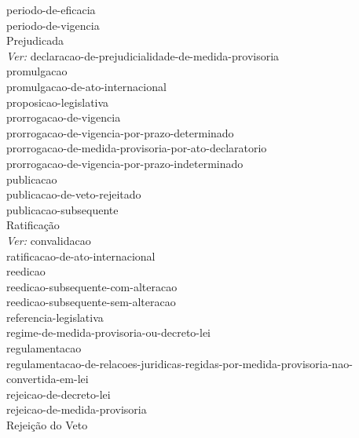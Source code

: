 \Gls{periodo-de-eficacia} \\ 
\Gls{periodo-de-vigencia} \\ 
Prejudicada \\ 
 \hspace*{1.0cm}\glosshsep \textit{Ver:} \Gls{declaracao-de-prejudicialidade-de-medida-provisoria} \\ 
\Gls{promulgacao} \\ 
\Gls{promulgacao-de-ato-internacional} \\ 
\Gls{proposicao-legislativa} \\ 
\Gls{prorrogacao-de-vigencia} \\ 
 \hspace*{1.0cm}\glosshsep \Gls{prorrogacao-de-vigencia-por-prazo-determinado} \\ 
 \hspace*{2.0cm}\glosshsep \Gls{prorrogacao-de-medida-provisoria-por-ato-declaratorio} \\ 
 \hspace*{1.0cm}\glosshsep \Gls{prorrogacao-de-vigencia-por-prazo-indeterminado} \\ 
\Gls{publicacao} \\ 
\Gls{publicacao-de-veto-rejeitado} \\ 
\Gls{publicacao-subsequente} \\ 
Ratificação \\ 
 \hspace*{1.0cm}\glosshsep \textit{Ver:} \Gls{convalidacao} \\ 
\Gls{ratificacao-de-ato-internacional} \\ 
\Gls{reedicao} \\ 
 \hspace*{1.0cm}\glosshsep \Gls{reedicao-subsequente-com-alteracao} \\ 
 \hspace*{1.0cm}\glosshsep \Gls{reedicao-subsequente-sem-alteracao} \\ 
\Gls{referencia-legislativa} \\ 
\Gls{regime-de-medida-provisoria-ou-decreto-lei} \\ 
\Gls{regulamentacao} \\ 
\Gls{regulamentacao-de-relacoes-juridicas-regidas-por-medida-provisoria-nao-convertida-em-lei} \\ 
\Gls{rejeicao-de-decreto-lei} \\ 
\Gls{rejeicao-de-medida-provisoria} \\ 
Rejeição do Veto \\ 
